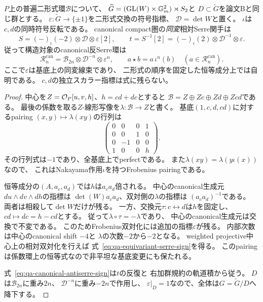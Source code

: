 \begin{lemma}[交換指標を含む相対Serre線形化]
\label{lem:qa-symmetric-equivariant-serre-character}
$P$上の普遍二形式環$\mathcal B$について、
$\widetilde G=(\operatorname{GL}(W)\times\mathbb G_m^2)\rtimes S_2$と
$D\subset\widetilde G$を論文Bと同じ群とする。
$\varepsilon:\widetilde G\to\{\pm1\}$を二形式交換の符号指標、
$\mathcal D=\det W$と置く。
$\iota$は$c,d$の同時符号反転である。
canonical compact圏の\emph{同変}相対Serre関手は
\begin{equation}
 S=(-)_\iota(-2)\otimes\mathcal D\otimes\varepsilon[2],
 \qquad
 t=S^{-1}[2]=(-)_\iota(2)\otimes\mathcal D^{-1}\otimes\varepsilon.
 \label{eq:qa-equivariant-serre-sign}
\end{equation}
従って構造対象のcanonical反Serre環は
\begin{equation}
 \mathcal R^{\mathrm{can}}_n
 =\mathcal B_{2n}\otimes\mathcal D^{-n}\otimes\varepsilon^n,
 \qquad a\star b=a\,\iota^n(b)\quad(a\in\mathcal R^{\mathrm{can}}_n).
 \label{eq:qa-canonical-antiserre-sign}
\end{equation}
ここで$\varepsilon$は基底上の同変線束であり、
二形式の順序を固定した恒等成分上では自明である。
$c,d$の独立スカラー指標は式に残らない。
\end{lemma}
\begin{proof}
中心を$Z=\mathcal O_P[u,v,h]$、$h=cd+dc$とすると
$\mathcal B=Z\oplus Zc\oplus Zd\oplus Zcd$である。
最後の係数を取る$Z$-線形写像を$\lambda:\mathcal B\to Z$と書く。
基底$(1,c,d,cd)$に対するpairing
$(x,y)\mapsto\lambda(xy)$の行列は
\[
 \begin{pmatrix}
 0&0&0&1\\
 0&0&1&0\\
 0&-1&0&0\\
 1&0&0&h
 \end{pmatrix}.
\]
その行列式は$-1$であり、全基底上でperfectである。
また$\lambda(xy)=\lambda(y\iota(x))$なので、
これはNakayama作用$\iota$を持つFrobenius pairingである。

恒等成分の$(A,a_c,a_d)$では$h$は$a_ca_d$倍される。
中心のcanonical生成元$du\wedge dv\wedge dh$の指標は
$\det(W)a_ca_d$、双対側の$\lambda$の指標は
$(a_ca_d)^{-1}$である。
両者は相殺して$\det W$だけが残る。
一方、交換元$\tau:c\leftrightarrow d$は$h$を固定し、
$cd\mapsto dc=h-cd$とする。
従って$\lambda\circ\tau=-\lambda$であり、
中心のcanonical生成元は交換で不変である。
このためFrobenius双対化には追加の指標$\varepsilon$が残る。
内部次数は中心のcanonical shift $-4$と
$\lambda$の次数$-2$から$-2$となる。
weighted projective中心上の相対双対化を行えば
式~\eqref{eq:qa-equivariant-serre-sign}を得る。
このpairingは係数環上の恒等式なので非平坦な基底変更にも保たれる。

式~\eqref{eq:qa-canonical-antiserre-sign}は$t$の反復と
右加群規約の軌道積から従う。
$D$は$\mathcal B_{2n}$に重み$2n$、
$\mathcal D^{-n}$に重み$-2n$で作用し、
$\varepsilon|_D=1$なので、全体は$G=\widetilde G/D$へ降下する。
\end{proof}

